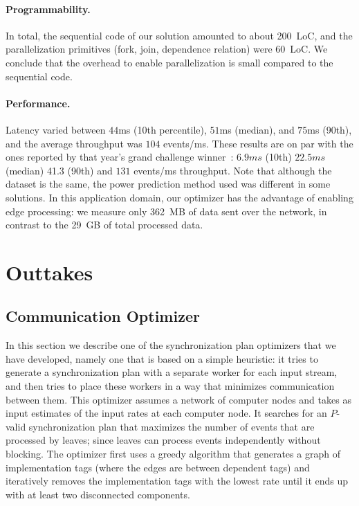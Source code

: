\paragraph{Programmability.}
In total, the sequential code of our solution amounted to about 200~LoC, and the parallelization primitives (fork, join,
dependence relation) were 60~LoC.  We conclude that the overhead to enable
parallelization is small compared to the sequential code.

\paragraph{Performance.}
Latency varied between $44$ms (10th percentile), $51$ms (median), and
$75$ms (90th), and the average throughput was $104$
events/ms. These results are on par with the ones reported
by that year's grand challenge winner~\cite{mutschler2014predictive}:
$6.9ms$ (10th) $22.5ms$ (median) 41.3 (90th) and $131$ events/ms
throughput.
Note that although the dataset is the same,
the power prediction method used was different in some solutions.  In
this application domain, our optimizer has the advantage of enabling
edge processing: we measure only 362~MB of data sent over the network,
in contrast to the 29~GB of total processed data.

\section{Outtakes}
\label{dgs:outtakes}

\subsection{Communication Optimizer}
\label{dgs:appendix:optimizer}

In this section we describe one of the synchronization plan optimizers that we have developed, namely one that is based on a simple
heuristic: it tries to generate a synchronization plan with a
separate worker for each input stream, and then tries to place these
workers in a way that minimizes communication between them.
This optimizer assumes a network of computer nodes and takes as input
estimates of the input rates at each computer node. It searches for an
$P$-valid synchronization plan that maximizes the number of events
that are processed by leaves; since leaves can process events
independently without blocking. The optimizer first uses a greedy
algorithm that generates a graph of implementation tags (where the
edges are between dependent tags) and iteratively removes the implementation
tags with the lowest rate until it ends up with at least two
disconnected components.


